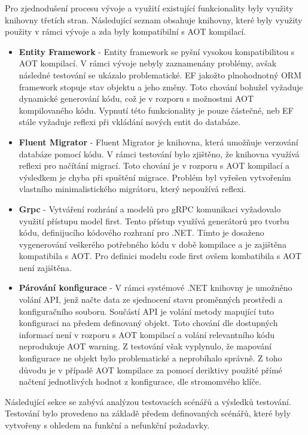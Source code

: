 
Pro zjednodušení procesu vývoje a využití existující funkcionality byly využity knihovny třetích stran. Následující seznam obsahuje knihovny, které byly využity použity v rámci vývoje a zda byly kompatibilní s AOT kompilací.

\begin{itemize}
  \item \textbf{Entity Framework} - Entity framework se pyšní vysokou kompatibilitou s AOT kompilací. V rámci vývoje nebyly zaznamenány problémy, avšak následné testování se ukázalo problematické. EF jakožto plnohodnotný ORM framework stopuje stav objektu a jeho změny. Toto chování bohužel vyžaduje dynamické generování kódu, což je v rozporu s možnostmi AOT kompilovaného kódu. Vypnutí této funkcionality je pouze částečné, neb EF stále vyžaduje reflexi při vkládání nových entit do databáze.
  \item \textbf{Fluent Migrator} - Fluent Migrator je knihovna, která umožňuje verzování databáze pomocí kódu. V rámci testování bylo zjištěno, že knihovna využívá reflexi pro načítání migrací. Toto chování je v rozporu s AOT kompilací a výsledkem je chyba při spuštění migrace. Problém byl vyřešen vytvořením vlastního minimalistického migrátoru, který nepoužívá reflexi.
  \item \textbf{Grpc} - Vytváření rozhrání a modelů pro gRPC komunikaci vyžadovalo využití přístupu model first. Tento přístup využívá generátorů pro tvorbu kódu, definijucího kódového rozhraní pro .NET. Tímto je dosaženo vygenerování veškerého potřebného kódu v době kompilace a je zajištěna kompatibila s AOT. Pro definici modelu code first ovšem kombatibila s AOT není zajištěna.
  \item \textbf{Párování konfigurace} - V rámci systémové .NET knihovny je umožněno volání API, jenž načte data ze sjednocení stavu proměnných prostředi a konfiguračního souboru. Součástí API je volání metody mapující tuto konfiguraci na předem definovaný objekt. Toto chování dle dostupných informací není v rozporu s AOT kompilací a volání relevantního kódu neprodukuje AOT warning. Z testování však vyplynulo, že mapování konfigurace ne objekt bylo problematické a neprobíhalo správně. Z toho důvodu je v případě AOT kompilace za pomocí deriktivy použité přímé načtení jednotlivých hodnot z konfigurace, dle stromomvého klíče.
\end{itemize}


Následující sekce se zabývá analýzou testovacích scénářů a výsledků testování. Testování bylo provedeno na základě předem definovaných scénářů, které byly vytvořeny s ohledem na funkční a nefunkční požadavky.

